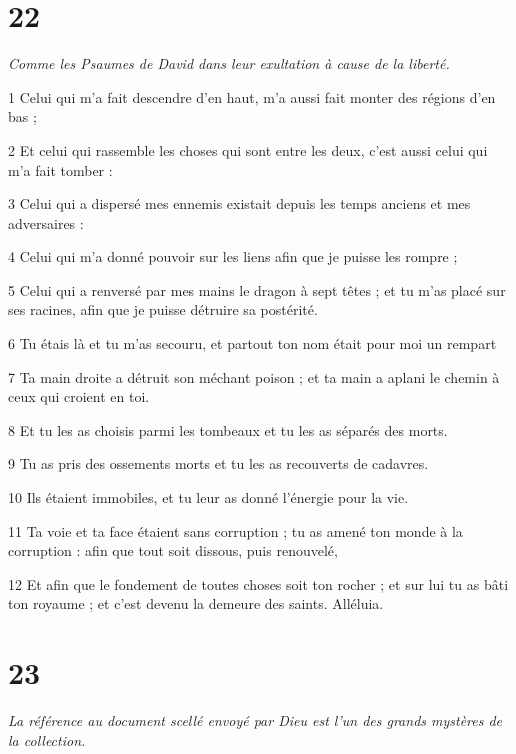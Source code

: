 \chapter{22}

\par \textit{Comme les Psaumes de David dans leur exultation à cause de la liberté.}

\par 1 Celui qui m'a fait descendre d'en haut, m'a aussi fait monter des régions d'en bas ;
\par 2 Et celui qui rassemble les choses qui sont entre les deux, c'est aussi celui qui m'a fait tomber :
\par 3 Celui qui a dispersé mes ennemis existait depuis les temps anciens et mes adversaires :
\par 4 Celui qui m'a donné pouvoir sur les liens afin que je puisse les rompre ;
\par 5 Celui qui a renversé par mes mains le dragon à sept têtes ; et tu m'as placé sur ses racines, afin que je puisse détruire sa postérité.
\par 6 Tu étais là et tu m'as secouru, et partout ton nom était pour moi un rempart
\par 7 Ta main droite a détruit son méchant poison ; et ta main a aplani le chemin à ceux qui croient en toi.
\par 8 Et tu les as choisis parmi les tombeaux et tu les as séparés des morts.
\par 9 Tu as pris des ossements morts et tu les as recouverts de cadavres.
\par 10 Ils étaient immobiles, et tu leur as donné l'énergie pour la vie.
\par 11 Ta voie et ta face étaient sans corruption ; tu as amené ton monde à la corruption : afin que tout soit dissous, puis renouvelé,
\par 12 Et afin que le fondement de toutes choses soit ton rocher ; et sur lui tu as bâti ton royaume ; et c'est devenu la demeure des saints. Alléluia.

\chapter{23}

\par \textit{La référence au document scellé envoyé par Dieu est l'un des grands mystères de la collection.}

